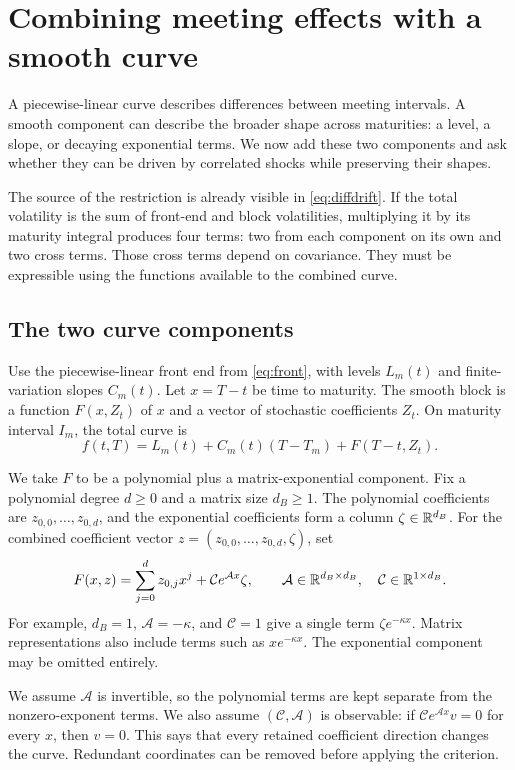 \section{Combining meeting effects with a smooth curve}\label{sec:splice}
A piecewise-linear curve describes differences between meeting intervals. A smooth component can describe the broader shape across maturities: a level, a slope, or decaying exponential terms. We now add these two components and ask whether they can be driven by correlated shocks while preserving their shapes.

The source of the restriction is already visible in \eqref{eq:diffdrift}. If the total volatility is the sum of front-end and block volatilities, multiplying it by its maturity integral produces four terms: two from each component on its own and two cross terms. Those cross terms depend on covariance. They must be expressible using the functions available to the combined curve.

\subsection{The two curve components}
Use the piecewise-linear front end from \eqref{eq:front}, with levels $L_m(t)$ and finite-variation slopes $C_m(t)$. Let $x=T-t$ be time to maturity. The smooth block is a function $F(x,Z_t)$ of $x$ and a vector of stochastic coefficients $Z_t$. On maturity interval $I_m$, the total curve is
\begin{equation}
f(t,T)=L_m(t)+C_m(t)(T-T_m)+F(T-t,Z_t).\label{eq:splice}
\end{equation}

We take $F$ to be a polynomial plus a matrix-exponential component. Fix a polynomial degree $d\ge0$ and a matrix size $d_B\ge1$. The polynomial coefficients are $z_{0,0},\ldots,z_{0,d}$, and the exponential coefficients form a column $\zeta\in\mathbb R^{d_B}$. For the combined coefficient vector $z=(z_{0,0},\ldots,z_{0,d},\zeta)$, set
\begin{equation}
F(x,z)=\sum_{j=0}^d z_{0,j}x^j+\mathcal C e^{\mathcal A x}\zeta,
\qquad \mathcal A\in\mathbb R^{d_B\times d_B},\quad \mathcal C\in\mathbb R^{1\times d_B}.
\label{eq:block}
\end{equation}
For example, $d_B=1$, $\mathcal A=-\kappa$, and $\mathcal C=1$ give a single term $\zeta e^{-\kappa x}$. Matrix representations also include terms such as $x e^{-\kappa x}$. The exponential component may be omitted entirely.

We assume $\mathcal A$ is invertible, so the polynomial terms are kept separate from the nonzero-exponent terms. We also assume $(\mathcal C,\mathcal A)$ is observable: if $\mathcal C e^{\mathcal A x}v=0$ for every $x$, then $v=0$. This says that every retained coefficient direction changes the curve. Redundant coordinates can be removed before applying the criterion.

